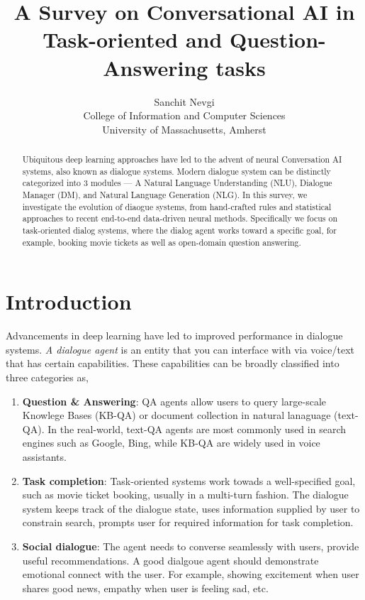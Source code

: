 \documentclass[11pt,a4paper]{article}
\title{A Survey on Conversational AI in\\
Task-oriented and Question-Answering tasks}
\author{Sanchit Nevgi \\
  College of Information and Computer Sciences \\
  University of Massachusetts, Amherst \\}
\begin{document}
\maketitle

\begin{abstract}
  Ubiquitous deep learning approaches have led to the advent of neural Conversation AI systems, also known as dialogue systems. Modern dialogue system can be distinctly categorized into 3 modules --- A Natural Language Understanding (NLU), Dialogue Manager (DM), and Natural Language Generation (NLG). In this survey, we investigate the evolution of diaogue systems, from hand-crafted rules and statistical approaches to recent end-to-end data-driven neural methods. Specifically we focus on task-oriented dialog systems, where the dialog agent works toward a specific goal, for example, booking movie tickets as well as open-domain question answering.
\end{abstract}

\section{Introduction}

Advancements in deep learning have led to improved performance in dialogue systems. \textit{A dialogue agent} is an entity that you can interface with via voice/text that has certain capabilities. These capabilities can be broadly classified into three categories \cite{Gao2019NeuralAT} as,

\begin{enumerate}[leftmargin=*, label={}]
  \item \textbf{Question \& Answering}: QA agents allow users to query large-scale Knowlege Bases (KB-QA) or document collection in natural lanaguage (text-QA). In the real-world, text-QA agents are most commonly used in search engines such as Google, Bing, while KB-QA are widely used in voice assistants.
  \item \textbf{Task completion}: Task-oriented systems work towads a well-specified goal, such as movie ticket booking, usually in a multi-turn fashion. The dialogue system keeps track of the dialogue state, uses information supplied by user to constrain search, prompts user for required information for task completion.
  \item \textbf{Social dialogue}: The agent needs to converse seamlessly with users, provide useful recommendations. A good dialgoue agent should demonstrate emotional connect with the user. For example, showing excitement when user shares good news, empathy when user is feeling sad, etc.
\end{enumerate}
\end{document}
